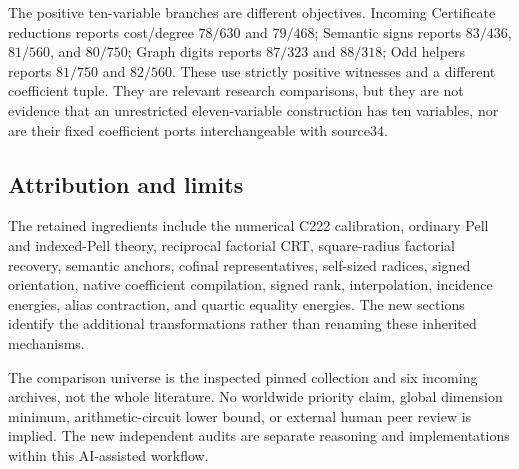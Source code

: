 The positive ten-variable branches are different objectives. Incoming
Certificate reductions reports cost/degree $78/630$ and $79/468$;
Semantic signs reports $83/436$, $81/560$, and $80/750$; Graph digits
reports $87/323$ and $88/318$; Odd helpers reports $81/750$ and $82/560$.
These use strictly positive witnesses and a different coefficient tuple.
They are relevant research comparisons, but they are not evidence that
an unrestricted eleven-variable construction has ten variables, nor are
their fixed coefficient ports interchangeable with source34.

\subsection{Attribution and limits}
The retained ingredients include the numerical C222 calibration, ordinary
Pell and indexed-Pell theory, reciprocal factorial CRT, square-radius
factorial recovery, semantic anchors, cofinal representatives, self-sized
radices, signed orientation, native coefficient compilation, signed rank,
interpolation, incidence energies, alias contraction, and quartic equality
energies. The new sections identify the additional transformations rather
than renaming these inherited mechanisms.

The comparison universe is the inspected pinned collection and six
incoming archives, not the whole literature. No worldwide priority claim,
global dimension minimum, arithmetic-circuit lower bound, or external
human peer review is implied. The new independent audits are separate
reasoning and implementations within this AI-assisted workflow.
